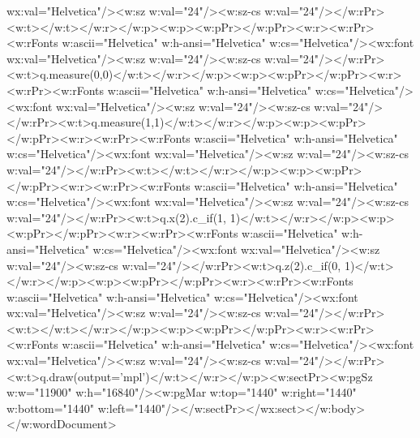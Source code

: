wx:val="Helvetica"/><w:sz w:val="24"/><w:sz-cs w:val="24"/></w:rPr><w:t></w:t></w:r></w:p><w:p><w:pPr></w:pPr><w:r><w:rPr><w:rFonts w:ascii="Helvetica" w:h-ansi="Helvetica" w:cs="Helvetica"/><wx:font wx:val="Helvetica"/><w:sz w:val="24"/><w:sz-cs w:val="24"/></w:rPr><w:t>q.measure(0,0)</w:t></w:r></w:p><w:p><w:pPr></w:pPr><w:r><w:rPr><w:rFonts w:ascii="Helvetica" w:h-ansi="Helvetica" w:cs="Helvetica"/><wx:font wx:val="Helvetica"/><w:sz w:val="24"/><w:sz-cs w:val="24"/></w:rPr><w:t>q.measure(1,1)</w:t></w:r></w:p><w:p><w:pPr></w:pPr><w:r><w:rPr><w:rFonts w:ascii="Helvetica" w:h-ansi="Helvetica" w:cs="Helvetica"/><wx:font wx:val="Helvetica"/><w:sz w:val="24"/><w:sz-cs w:val="24"/></w:rPr><w:t></w:t></w:r></w:p><w:p><w:pPr></w:pPr><w:r><w:rPr><w:rFonts w:ascii="Helvetica" w:h-ansi="Helvetica" w:cs="Helvetica"/><wx:font wx:val="Helvetica"/><w:sz w:val="24"/><w:sz-cs w:val="24"/></w:rPr><w:t>q.x(2).c_if(1, 1)</w:t></w:r></w:p><w:p><w:pPr></w:pPr><w:r><w:rPr><w:rFonts w:ascii="Helvetica" w:h-ansi="Helvetica" w:cs="Helvetica"/><wx:font wx:val="Helvetica"/><w:sz w:val="24"/><w:sz-cs w:val="24"/></w:rPr><w:t>q.z(2).c_if(0, 1)</w:t></w:r></w:p><w:p><w:pPr></w:pPr><w:r><w:rPr><w:rFonts w:ascii="Helvetica" w:h-ansi="Helvetica" w:cs="Helvetica"/><wx:font wx:val="Helvetica"/><w:sz w:val="24"/><w:sz-cs w:val="24"/></w:rPr><w:t></w:t></w:r></w:p><w:p><w:pPr></w:pPr><w:r><w:rPr><w:rFonts w:ascii="Helvetica" w:h-ansi="Helvetica" w:cs="Helvetica"/><wx:font wx:val="Helvetica"/><w:sz w:val="24"/><w:sz-cs w:val="24"/></w:rPr><w:t>q.draw(output='mpl')</w:t></w:r></w:p><w:sectPr><w:pgSz w:w="11900" w:h="16840"/><w:pgMar w:top="1440" w:right="1440" w:bottom="1440" w:left="1440"/></w:sectPr></wx:sect></w:body></w:wordDocument>